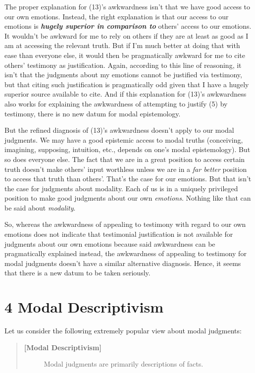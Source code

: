 \documentclass[a4paper,12pt]{article}
\begin{document}
The proper explanation for (13)'s awkwardness isn't that we have good access to our own emotions. Instead, the right explanation is that our access to our emotions is \emph{\textbf{hugely superior in comparison to}} others' access to our emotions. It wouldn't be awkward for me to rely on others if they are at least as good as I am at accessing the relevant truth. But if I'm much better at doing that with ease than everyone else, it would then be pragmatically awkward for me to cite others' testimony as justification. Again, according to this line of reasoning, it isn't that the judgments about my emotions cannot be justified via testimony, but that citing such justification is pragmatically odd given that I have a hugely superior source available to cite. And if this explanation for (13)'s awkwardness also works for explaining the awkwardness of attempting to justify (5) by testimony, there is no new datum for modal epistemology.

But the refined diagnosis of (13)'s awkwardness doesn't apply to our modal judgments. We may have a good epistemic access to modal truths (conceiving, imagining, supposing, intuition, etc., depends on one's modal epistemology). But so does everyone else. The fact that we are in a great position to access certain truth doesn't make others' input worthless unless we are in a \emph{far better} position to access that truth than others'. That's the case for our emotions. But that isn't the case for judgments about modality. Each of us is in a uniquely privileged position to make good judgments about our own \emph{emotions}. Nothing like that can be said about \emph{modality}.

So, whereas the awkwardness of appealing to testimony with regard to our own emotions does not indicate that testimonial justification is not available for judgments about our own emotions because said awkwardness can be pragmatically explained instead, the awkwardness of appealing to testimony for modal judgments doesn't have a similar alternative diagnosis. Hence, it seems that there is a new datum to be taken seriously.

\section*{4 Modal Descriptivism}

Let us consider the following extremely popular view about modal judgments:

\begin{quote}
\begin{description}
\item[\textbf{[Modal Descriptivism]}] Modal judgments are primarily descriptions of facts.
\end{description}
\end{quote}
\end{document}
